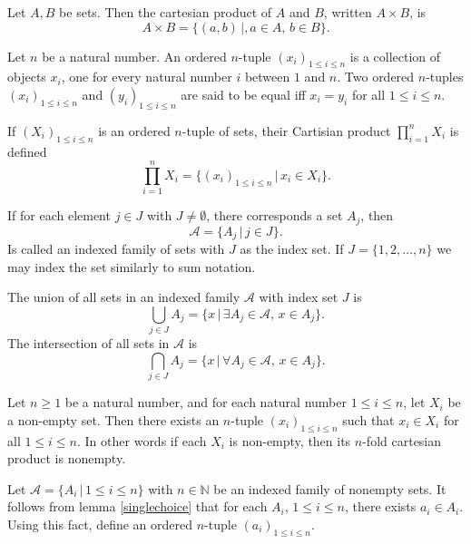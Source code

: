 \documentclass{article}
\begin{document}
\begin{definition}
	Let \(A,B\) be sets. Then the cartesian product of \(A\) and \(B\), written \(A\times B\), is
	\begin{equation*}
		A\times B=\{(a,b)\,|,a\in A,\,b\in B\}.
	\end{equation*}
\end{definition}
\begin{definition}
	Let \(n\) be a natural number. An ordered \(n\)-tuple \((x_i)_{1\leq i\leq n}\) is a collection of objects \(x_i\), one for every natural number \(i\) between \(1\) and \(n\). Two ordered \(n\)-tuples \((x_i)_{1\leq i\leq n}\) and \((y_i)_{1\leq i\leq n}\) are said to be equal iff \(x_i=y_i\) for all \(1\leq i\leq n\).
\end{definition}
\begin{definition}
	If \((X_i)_{1\leq i\leq n}\) is an ordered \(n\)-tuple of sets, their Cartisian product \(\prod_{i=1}^{n}X_i\) is defined
	\begin{equation*}
		\prod_{i=1}^n X_i=\{(x_i)_{1\leq i\leq n}\,|\, x_i\in X_i\}.
	\end{equation*}
\end{definition}
\begin{definition}
	If for each element \(j\in J\) with \(J\neq\emptyset\), there corresponds a set \(A_j\), then
	\begin{equation*}
		\mathscr{A}=\{A_j\,|\,j\in J\}.
	\end{equation*}
	Is called an indexed family of sets with \(J\) as the index set. If \(J=\{1,2,\ldots,n\}\) we may index the set similarly to sum notation.
\end{definition}
\begin{definition}
	The union of all sets in an indexed family \(\mathscr{A}\) with index set \(J\) is
	\begin{equation*}
		\bigcup_{j\in J}A_j=\{x\,|\,\exists A_j\in\mathscr{A},\,x\in A_j\}.
	\end{equation*}
	The intersection of all sets in \(\mathscr{A}\) is
	\begin{equation*}
		\bigcap_{j\in J}A_j=\{x\,|\,\forall A_j\in\mathscr{A},\,x\in A_j\}.
	\end{equation*}
\end{definition}
\begin{lemma}
	Let \(n\geq 1\) be a natural number, and for each natural number \(1\leq i\leq n\), let \(X_i\) be a non-empty set. Then there exists an \(n\)-tuple \((x_i)_{1\leq i\leq n}\) such that \(x_i\in X_i\) for all \(1\leq i\leq n\). In other words if each \(X_i\) is non-empty, then its \(n\)-fold cartesian product is nonempty.
	\begin{IEEEproof}
		Let \(\mathscr{A}=\{A_i\,|\,1\leq i\leq n\}\) with \(n\in\mathbb{N}\) be an indexed family of nonempty sets. It follows from lemma \ref{singlechoice} that for each \(A_i\), \(1\leq i\leq n\), there exists \(a_i\in A_i\). Using this fact, define an ordered \(n\)-tuple \((a_i)_{1\leq i\leq n}\).
	\end{IEEEproof}
\end{lemma}
\end{document}
